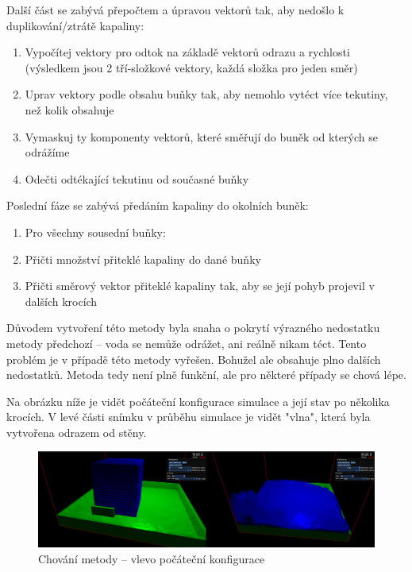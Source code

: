 \documentclass[12pt,a4paper,titlepage,final]{report}
\begin{document}
Další část se zabývá přepočtem a úpravou vektorů tak, aby nedošlo k duplikování/ztrátě kapaliny:
\begin{enumerate}
    \item Vypočítej vektory pro odtok na základě vektorů odrazu a rychlosti (výsledkem jsou 2 tří-složkové vektory, každá složka pro jeden směr)
    \item Uprav vektory podle obsahu buňky tak, aby nemohlo vytéct více tekutiny, než kolik obsahuje
    \item Vymaskuj ty komponenty vektorů, které směřují do buněk od kterých se odrážíme
    \item Odečti odtékající tekutinu od současné buňky
\end{enumerate}

Poslední fáze se zabývá předáním kapaliny do okolních buněk:
\begin{enumerate}
    \item Pro všechny sousední buňky:
    \item Přičti množství přiteklé kapaliny do dané buňky
    \item Přičti směrový vektor přiteklé kapaliny tak, aby se její pohyb projevil v dalších krocích
\end{enumerate}

Důvodem vytvoření této metody byla snaha o pokrytí výrazného nedostatku metody předchozí -- voda se nemůže odrážet, ani reálně nikam téct. Tento problém je v případě této metody vyřešen. Bohužel ale obsahuje plno dalších nedostatků. Metoda tedy není plně funkční, ale pro některé případy se chová lépe.

Na obrázku níže je vidět počáteční konfigurace simulace a její stav po několika krocích. V levé části snímku v průběhu simulace je vidět "vlna", která byla vytvořena odrazem od stěny.

\begin{figure}[H]
    \centering
    \includegraphics[scale=1]{images/velo.png}
    \caption{Chování metody -- vlevo počáteční konfigurace}
    \label{fig:velo}
\end{figure}
\end{document}

